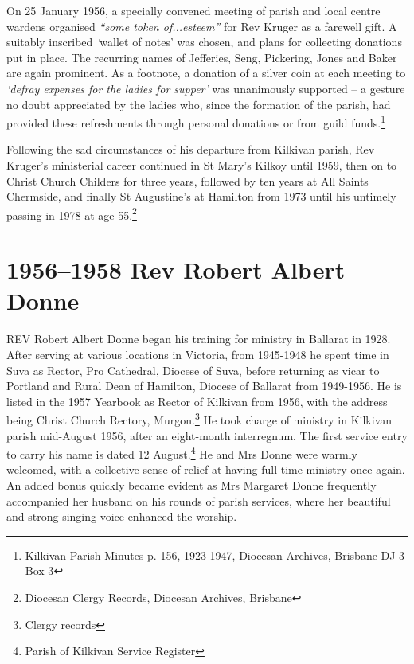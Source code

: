 On 25 January 1956, a specially convened meeting of parish and local centre wardens organised \emph{``some token of...esteem''} for Rev Kruger as a farewell gift. A suitably inscribed \emph{`}wallet of notes' was chosen, and plans for collecting donations put in place. The recurring names of Jefferies, Seng, Pickering, Jones and Baker are again prominent. As a footnote, a donation of a silver coin at each meeting to \emph{`defray expenses for the ladies for supper'} was unanimously supported -- a gesture no doubt appreciated by the ladies who, since the formation of the parish, had provided these refreshments through personal donations or from guild funds.\footnote{Kilkivan Parish Minutes p. 156, 1923-1947, Diocesan Archives, Brisbane DJ 3 Box 3}


Following the sad circumstances of his departure from Kilkivan parish, Rev Kruger's ministerial career continued in St Mary's Kilkoy until 1959, then on to Christ Church Childers for three years, followed by ten years at All Saints Chermside, and finally St Augustine's at Hamilton from 1973 until his untimely passing in 1978 at age 55.\footnote{Diocesan Clergy Records, Diocesan Archives, Brisbane}


\balance


\printendnotes[custom]
\setcounter{endnote}{0}
\chapter{1956--1958 Rev Robert Albert Donne}
\nobalance


\lettrine[lines=3]{R}{EV}
 Robert Albert Donne began his training for ministry in Ballarat in 1928. After serving at various locations in Victoria, from 1945-1948 he spent time in Suva as Rector, Pro Cathedral, Diocese of Suva, before returning as vicar to Portland and Rural Dean of Hamilton, Diocese of Ballarat from 1949-1956. He is listed in the 1957 Yearbook as Rector of Kilkivan from 1956, with the address being Christ Church Rectory, Murgon.\footnote{Clergy records} He took charge of ministry in Kilkivan parish mid-August 1956, after an eight-month interregnum. The first service entry to carry his name is dated 12 August.\footnote{Parish of Kilkivan Service Register} He and Mrs Donne were warmly welcomed, with a collective sense of relief at having full-time ministry once again. An added bonus quickly became evident as Mrs Margaret Donne frequently accompanied her husband on his rounds of parish services, where her beautiful and strong singing voice enhanced the worship.







